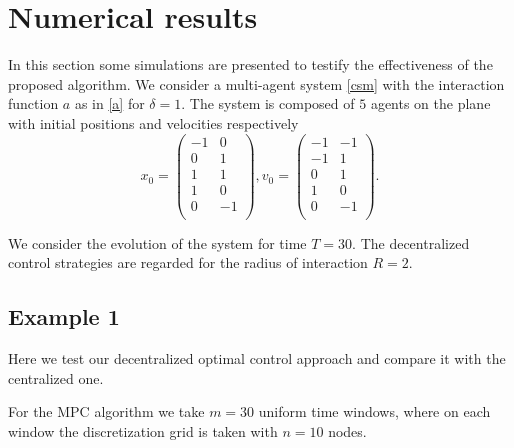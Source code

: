 \documentclass[a4paper, english]{article}
\begin{document}
 \section{Numerical results}
In this section some simulations are presented to testify the effectiveness of the proposed algorithm. We consider a multi-agent system \eqref{csm} with the interaction function
$a$ as in \eqref{a} for $\delta = 1$. The system is composed of $5$
agents on the plane with initial positions and velocities respectively
\[x_0 =  \left( \begin{array}{cc}
		  -1  &   0\\
           0  &   1\\
           1  &   1\\
           1  &   0\\
           0 &   -1\\
\end{array} \right),
%
v_0 =
\left( \begin{array}{cc}
	     -1&  -1\\
	     -1&   1\\
	      0&   1\\
	      1&   0\\
	      0&  -1\\
\end{array} \right).
\]

We consider the evolution of the system for time $T = 30$. The decentralized control strategies are regarded for the radius of interaction $R = 2$.
 \subsection{Example 1}
Here we test our decentralized optimal control approach and compare it with the centralized one.

For the MPC algorithm we take  $m = 30$ uniform time windows, where  on each window the discretization grid
is taken with $n = 10$ nodes.
\end{document}
